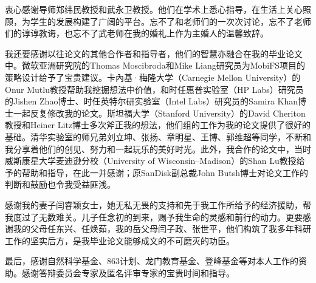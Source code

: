 
\begin{ack}

衷心感谢导师郑纬民教授和武永卫教授。他们在学术上悉心指导，在生活上关心照顾，为学生的发展构建了广阔的平台。忘不了和老师们的一次次讨论，忘不了老师们的谆谆教诲，也忘不了武老师在我的婚礼上作为主婚人的温馨致辞。

我还要感谢以往论文的其他合作者和指导者，他们的智慧亦融合在我的毕业论文中。微软亚洲研究院的Thomas Moscibroda和Mike Liang研究员为MobiFS项目的策略设计给予了宝贵建议。卡內基·梅隆大学（Carnegie Mellon University）的Onur Mutlu教授帮助我挖掘想法中价值，和时任惠普实验室（HP Labs）研究员的Jishen Zhao博士、时任英特尔研实验室（Intel Labs）研究员的Samira Khan博士一起反复修改我的论文。斯坦福大学（Stanford University）的David Cheriton教授和Heiner Litz博士多次斧正我的想法，他们组的工作为我的论文提供了很好的基础。清华实验室的师兄弟刘立坤、张扬、章明星、王博、郭维超等同学，不断和我分享着他们的创见、努力和一起玩乐的美好时光。此外，我合作的论文中，当时威斯康星大学麦迪逊分校（University of Wisconsin–Madison）的Shan Lu教授给予的帮助和指导，在此一并感谢；原SanDisk副总裁John Butsh博士对论文工作的判断和鼓励也令我受益匪浅。

感谢我的妻子闫睿颖女士，她无私无畏的支持和先于我工作所给予的经济援助，帮我度过了无数难关。儿子任念初的到来，赐予我生命的灵感和前行的动力。更要感谢我的父母任东兴、任焕茹，我的岳父母闫子政、张世平，他们构筑了我多年科研工作的坚实后方，是我毕业论文能够成文的不可磨灭的功臣。

最后，感谢自然科学基金、863计划、龙门教育基金、登峰基金等对本人工作的资助。感谢答辩委员会专家及匿名评审专家的宝贵时间和指导。

\end{ack}
